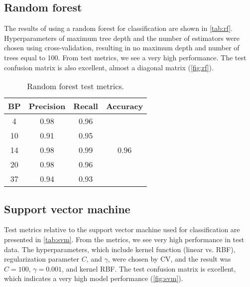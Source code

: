     \subsection{Random forest}

        The results of using a random forest for classification are shown in \autoref{tab:rf}. Hyperparameters of maximum tree depth and the number of estimators were chosen using cross-validation, resulting in no maximum depth and number of trees equal to 100. From test metrics, we see a very high performance. The test confusion matrix is also excellent, almost a diagonal matrix (\autoref{fig:rf}).
        
        \begin{table}[H]
                \centering
                \caption{Random forest test metrics.}
                \label{tab:rf}
                \begin{tabular}{c|cc|c}
                BP & Precision & Recall & Accuracy              \\ \hline
                4  & 0.98      & 0.96   & \multirow{5}{*}{0.96} \\
                10 & 0.91      & 0.95   &                       \\
                14 & 0.98      & 0.99   &                       \\
                20 & 0.98      & 0.96   &                       \\
                37 & 0.94      & 0.93   &                      
                \end{tabular}
        \end{table}

    \subsection{Support vector machine}

        Test metrics relative to the support vector machine used for classification are presented in \autoref{tab:svm}. From the metrics, we see very high performance in test data. The hyperparameters, which include kernel function (linear vs. RBF), regularization parameter $C$, and $\gamma$, were chosen by CV, and the result was $C = 100$, $\gamma = 0.001$, and kernel RBF. The test confusion matrix is excellent, which indicates a very high model performance (\autoref{fig:svm}).
        
